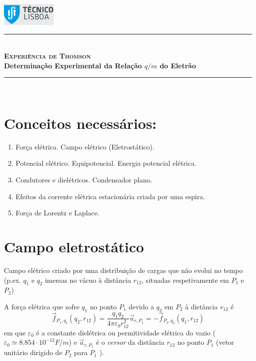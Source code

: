 \documentclass[a4paper,twoside,12pt]{article}      %
\author{Prof. Bernardo B. Carvalho}
\date{ Setembro 2014}
\newcommand{\HRule}{\rule{\linewidth}{0.5mm}}
\begin{document}
 

\includegraphics[width=0.2\textwidth]{../logo-ist}%

\HRule \\[0.5cm]
{ \huge   \bfseries \textsc{ Experiência de Thomson} }\\[0.4cm]
{ \large \bfseries Determinação Experimental da Relação $q/m$ do Eletrão }\\
\HRule \\%


\section{\sf  Conceitos necessários:} 
\begin{enumerate}
	\item Força elétrica. Campo elétrico (Eletrostático).
	\item Potencial elétrico. Equipotencial. Energia potencial elétrica.
	\item Condutores e dielétricos. Condensador plano.
	\item Efeitos da corrente elétrica estacionária criada por uma espira. 	
	\item Força de Lorentz e Laplace.
\end{enumerate}

\section{\sf Campo eletrostático}

 Campo elétrico criado por uma distribuição de cargas que não evolui no tempo (p.ex. $q_1$ e $q_2$ imersas no vácuo à distância $r_{12}$, situadas respetivamente em $P_1$ e $P_2$)

A força elétrica que sofre $q_1$ no ponto $P_1$ devido a $q_2$ em $P_2$ à distância $r_{12}$ é
\begin{equation}
	\vec{f}_{P_1,q_1} (q_2, r_{1 2} ) = \frac{q_1 q_2}{4 \pi \varepsilon_0 r_{1 2}^2} \vec{u}_{r,P_1} = 
	- \vec{f}_{P_2,q_2} (q_1, r_{1 2} )
\end{equation}
em que $\varepsilon_0$  é a constante dielétrica ou permitividade elétrica do vazio ($\varepsilon_0 \simeq 8.854 \cdot 10^{-12} F/m$) e	
 $\vec{u}_{r,P_1}$  é o \emph{versor} da distância $r_{1 2} $ no ponto $P_1$  (vetor unitário dirigido de $P_2$ para $P_1$ ).
\end{document}
